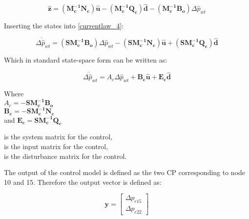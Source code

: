  \begin{equation}
 \bm{\hat{z}} =  (\bm{M_c^{-1}}\bm{N_c}) \bm{\hat{u}} - (\bm{M_c^{-1}}\bm{Q_c}) \bm{\hat{d}} - (\bm{M_c^{-1}}\bm{B_o}) \Delta \hat{p}_{wt}    
 \label{statespace_control_sys_state}
\end{equation}

Inserting the states into \eqref{currentlaw_4}:

 \begin{equation}
\Delta \dot{\hat{p}}_{wt} = (\bm{S}\bm{M_c^{-1}}\bm{B_o}) \Delta \hat{p}_{wt}  - (\bm{S}\bm{M_c^{-1}}\bm{N_c}) \bm{\hat{u}} + (\bm{S}\bm{M_c^{-1}}\bm{Q_c}) \bm{\hat{d}} 
 \label{statespace_control_sys_state_1}
\end{equation}

Which in standard state-space form can be written as: 

 \begin{equation}
\Delta \dot{\hat{p}}_{wt} = A_c \Delta \hat{p}_{wt}  + \bm{B_c} \bm{\hat{u}} + \bm{E_c} \bm{\hat{d}} 
 \label{statespace_control_sys_state_2}
\end{equation}

\begin{minipage}[t]{0.40\textwidth}
Where\\
\hspace*{8mm} $A_c = -\bm{S}\bm{M_c^{-1}}\bm{B_o} $ \\
\hspace*{8mm} $\bm{B_c} = -\bm{S}\bm{M_c^{-1}}\bm{N_c} $ \\
and \hspace*{0.7mm} $\bm{E_c} = \bm{S}\bm{M_c^{-1}}\bm{Q_c} $
\end{minipage}
\begin{minipage}[t]{0.48\textwidth}
\vspace*{1mm}
is the system matrix for the control, \\
is the input matrix for the control, \\
is the disturbance matrix for the control.
\end{minipage} 

The output of the control model is defined as the two CP corresponding to node 10 and 15. Therefore the output vector is defined as: 

\begin{equation}
\bm{y} =
\begin{bmatrix} 
\Delta p_{e15} \\
\Delta p_{e22} 
\label{outputvector_control}
\end{bmatrix} 
\end{equation}


